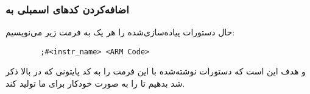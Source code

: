 \begin{itemize}
	\subsubsection*{اضافه‌کردن کدهای اسمبلی به 
		}
	
	حال دستورات پیاده‌سازی‌شده را هر یک به فرمت زیر می‌نویسیم:
	
	\begin{latin}
		\begin{verbatim}
		;#<instr_name> <ARM Code>
		\end{verbatim}
	\end{latin}
	
	و هدف این است که دستورات نوشته‌شده با این فرمت را به کد پایتونی که در بالا  ذکر شد بدهیم تا 
	را به صورت خودکار برای ما تولید کند.
\end{itemize}


